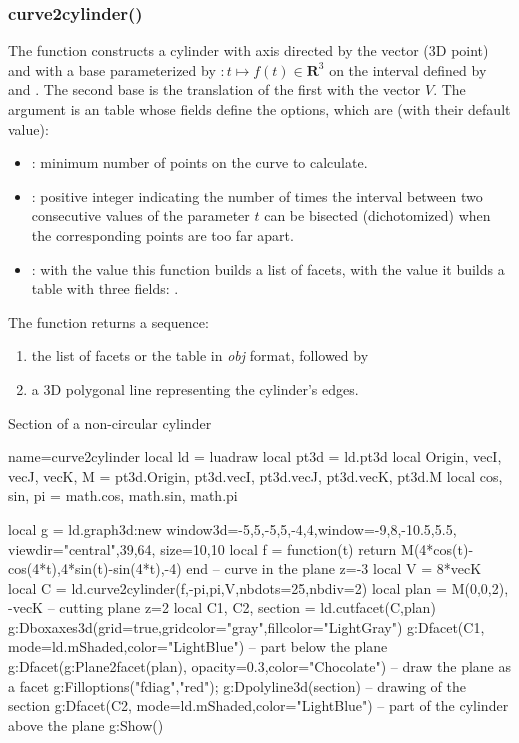 \subsubsection{curve2cylinder()}

The function  constructs a cylinder with axis directed by the vector  (3D point) and with a base parameterized by $\colon t\mapsto f(t)\in\mathbf R^3$ on the interval defined by  and . The second base is the translation of the first with the vector $V$. The argument  is an table whose fields define the options, which are (with their default value):
\begin{itemize}
    \item {}: minimum number of points on the curve to calculate.
    
    \item {}: positive integer indicating the number of times the interval between two consecutive values ​​of the parameter $t$ can be bisected (dichotomized) when the corresponding points are too far apart.
    
    \item {} : with the value \false this function builds a list of facets, with the value \true it builds a table with three fields: .
\end{itemize}
The function returns a sequence:
\begin{enumerate}
    \item the list of facets or the table in \emph{obj} format, followed by
    \item a 3D polygonal line representing the cylinder's edges.
\end{enumerate}

\begin{demo}{Section of a non-circular cylinder}
\begin{luadraw}{name=curve2cylinder}
local ld = luadraw
local pt3d = ld.pt3d
local Origin, vecI, vecJ, vecK, M = pt3d.Origin, pt3d.vecI, pt3d.vecJ, pt3d.vecK, pt3d.M
local cos, sin, pi = math.cos, math.sin, math.pi

local g = ld.graph3d:new{ window3d={-5,5,-5,5,-4,4},window={-9,8,-10.5,5.5},
    viewdir={"central",39,64}, size={10,10}}
local f = function(t) return M(4*cos(t)-cos(4*t),4*sin(t)-sin(4*t),-4) end -- curve in the plane z=-3
local V = 8*vecK
local C = ld.curve2cylinder(f,-pi,pi,V,{nbdots=25,nbdiv=2})
local plan = {M(0,0,2), -vecK} -- cutting plane z=2
local C1, C2, section = ld.cutfacet(C,plan)
g:Dboxaxes3d({grid=true,gridcolor="gray",fillcolor="LightGray"})
g:Dfacet(C1, {mode=ld.mShaded,color="LightBlue"}) -- part below the plane
g:Dfacet(g:Plane2facet(plan), {opacity=0.3,color="Chocolate"}) -- draw the plane as a facet
g:Filloptions("fdiag","red"); g:Dpolyline3d(section) -- drawing of the section
g:Dfacet(C2, {mode=ld.mShaded,color="LightBlue"}) -- part of the cylinder above the plane
g:Show()
\end{luadraw}
\end{demo}


